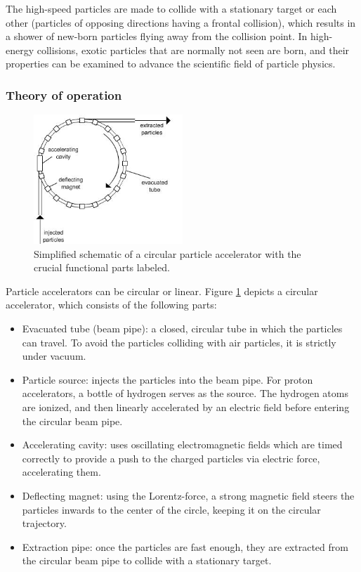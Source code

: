 \documentclass[12pt]{article}
\begin{document}
The high-speed particles are made to collide with a stationary target or each other (particles of opposing directions having a frontal collision), which results in a shower of new-born particles flying away from the collision point. In high-energy collisions, exotic particles that are normally not seen are born, and their properties can be examined to advance the scientific field of particle physics.


\subsubsection{Theory of operation}\label{sec_part_accel_theory}

\begin{figure}[H]
	\begin{center}
		\includegraphics[width=0.5\textwidth]{particle_accelerator_schematic}
	\end{center}
	\caption{Simplified schematic of a circular particle accelerator with the crucial functional parts labeled.}
	\label{fig_part_accel_schematic}
\end{figure}

Particle accelerators can be circular or linear. Figure \ref{fig_part_accel_schematic} depicts a circular accelerator, which consists of the following parts:
\begin{itemize}
	\item Evacuated tube (beam pipe): a closed, circular tube in which the particles can travel. To avoid the particles colliding with air particles, it is strictly under vacuum.
	\item Particle source: injects the particles into the beam pipe. For proton accelerators, a bottle of hydrogen serves as the source. The hydrogen atoms are ionized, and then linearly accelerated by an electric field before entering the circular beam pipe.
	\item Accelerating cavity: uses oscillating electromagnetic fields which are timed correctly to provide a push to the charged particles via electric force, accelerating them.
	\item Deflecting magnet: using the Lorentz-force, a strong magnetic field steers the particles inwards to the center of the circle, keeping it on the circular trajectory.
	\item Extraction pipe: once the particles are fast enough, they are extracted from the circular beam pipe to collide with a stationary target.
\end{itemize}
\end{document}
